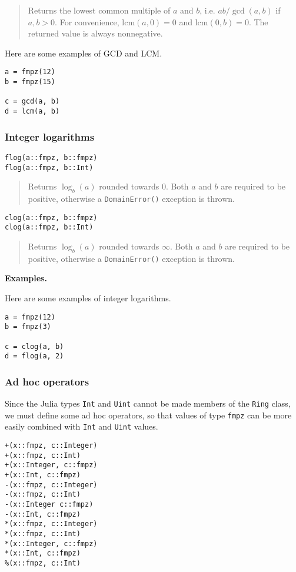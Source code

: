\documentclass[a4paper,10pt]{article}
\newcommand{\code}{\lstinline}
\newcommand{\desc}[1]{\vspace{-3mm}\begin{quote}#1\end{quote}}
\begin{document}
{{\desc{Returns the lowest common multiple of $a$ and $b$, i.e. $ab/\gcd(a, b)$ if
$a, b > 0$. For convenience, lcm$(a, 0) = 0$ and lcm$(0, b) = 0$. The returned
value is always nonnegative.}

Here are some examples of GCD and LCM.

\begin{lstlisting}
a = fmpz(12)
b = fmpz(15)

c = gcd(a, b)
d = lcm(a, b)
\end{lstlisting}

\subsubsection{Integer logarithms}

\begin{lstlisting}
flog(a::fmpz, b::fmpz)
flog(a::fmpz, b::Int)
\end{lstlisting}

\desc{Returns $\log_b(a)$ rounded towards $0$. Both $a$ and $b$ are required
to be positive, otherwise a \code{DomainError()} exception is thrown.}

\begin{lstlisting}
clog(a::fmpz, b::fmpz)
clog(a::fmpz, b::Int)
\end{lstlisting}

\desc{Returns $\log_b(a)$ rounded towards $\infty$. Both $a$ and $b$ are required
to be positive, otherwise a \code{DomainError()} exception is thrown.}

\textbf{Examples.}

Here are some examples of integer logarithms.

\begin{lstlisting}
a = fmpz(12)
b = fmpz(3)

c = clog(a, b)
d = flog(a, 2)
\end{lstlisting}

\subsubsection{Ad hoc operators}

Since the Julia types \code{Int} and \code{Uint} cannot be made members of the
\code{Ring} class, we must define some ad hoc operators, so that values of type
\code{fmpz} can be more easily combined with \code{Int} and \code{Uint} values.

\begin{lstlisting}
+(x::fmpz, c::Integer)
+(x::fmpz, c::Int)
+(x::Integer, c::fmpz)
+(x::Int, c::fmpz)
-(x::fmpz, c::Integer)
-(x::fmpz, c::Int)
-(x::Integer c::fmpz)
-(x::Int, c::fmpz)
*(x::fmpz, c::Integer)
*(x::fmpz, c::Int)
*(x::Integer, c::fmpz)
*(x::Int, c::fmpz)
%(x::fmpz, c::Int)
\end{lstlisting}

}}
\end{document}

